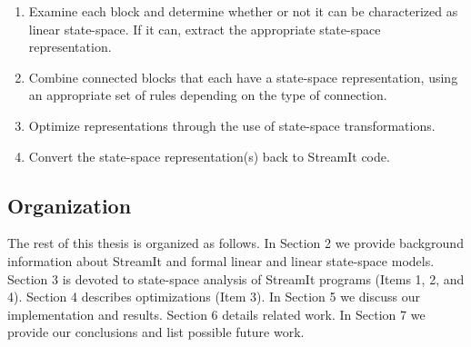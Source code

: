 \begin{enumerate}
\item Examine each block and determine whether or not it can be
characterized as linear state-space. If it can, extract the
appropriate state-space representation.

\item Combine connected blocks that each have a state-space
representation, using an appropriate set of rules depending on the
type of connection.

\item Optimize representations through the use of state-space
transformations.

\item Convert the state-space representation(s) back to StreamIt
code.
\end{enumerate}

\subsection{Organization}

    The rest of this thesis is organized as follows.  In Section 2 we
provide background information about StreamIt and formal linear
and linear state-space models.  Section 3 is devoted to
state-space analysis of StreamIt programs (Items 1, 2, and 4).
Section 4 describes optimizations (Item 3). In Section 5 we
discuss our implementation and results.  Section 6 details related
work.  In Section 7 we provide our conclusions and list possible
future work.
